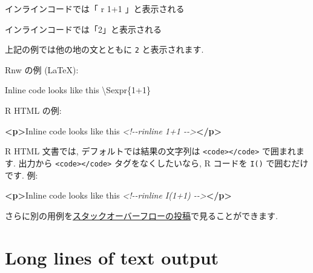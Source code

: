 \documentclass[
  lualatex,ja=standard,jafont=noto-otf]{bxjsreport}
\newenvironment{Shaded}{\begin{snugshade}}{\end{snugshade}}
\newcommand{\CommentTok}[1]{\textcolor[rgb]{0.56,0.35,0.01}{\textit{#1}}}
\newcommand{\InformationTok}[1]{\textcolor[rgb]{0.56,0.35,0.01}{\textbf{\textit{#1}}}}
\newcommand{\KeywordTok}[1]{\textcolor[rgb]{0.13,0.29,0.53}{\textbf{#1}}}
\newcommand{\NormalTok}[1]{#1}
\begin{document}
\begin{Shaded}
\begin{Highlighting}[]
\NormalTok{インラインコードでは「\textasciigrave{}\textasciigrave{}}\InformationTok{\textasciigrave{} \textasciigrave{}}\NormalTok{r\textquotesingle{}\textquotesingle{} 1+1\textasciigrave{} \textasciigrave{}\textasciigrave{}\textasciigrave{}」と表示される}
\end{Highlighting}
\end{Shaded}

インラインコードでは「2」と表示される

上記の例では他の地の文とともに \texttt{2} と表示されます.

Rnw の例 (LaTeX):

\begin{Shaded}
\begin{Highlighting}[numbers=left,,]
\NormalTok{Inline code looks like this \textbackslash{}Sexpr\{1+1\}}
\end{Highlighting}
\end{Shaded}

R HTML の例:

\begin{Shaded}
\begin{Highlighting}[]
\KeywordTok{\textless{}p\textgreater{}}\NormalTok{Inline code looks like this }\CommentTok{\textless{}!{-}{-}rinline 1+1 {-}{-}\textgreater{}}\KeywordTok{\textless{}/p\textgreater{}}
\end{Highlighting}
\end{Shaded}

R HTML 文書では, デフォルトでは結果の文字列は
\texttt{\textless{}code\textgreater{}\textless{}/code\textgreater{}}
で囲まれます. 出力から
\texttt{\textless{}code\textgreater{}\textless{}/code\textgreater{}}
タグをなくしたいなら, R コードを \texttt{I()} で囲むだけです. 例:

\begin{Shaded}
\begin{Highlighting}[]
\KeywordTok{\textless{}p\textgreater{}}\NormalTok{Inline code looks like this }\CommentTok{\textless{}!{-}{-}rinline I(1+1) {-}{-}\textgreater{}}\KeywordTok{\textless{}/p\textgreater{}}
\end{Highlighting}
\end{Shaded}

さらに別の用例を\href{http://stackoverflow.com/q/14124022/559676}{スタックオーバーフローの投稿}で見ることができます.

\hypertarget{long-lines-of-text-output}{%
\section*{Long lines of text output}\label{long-lines-of-text-output}}
\end{document}
